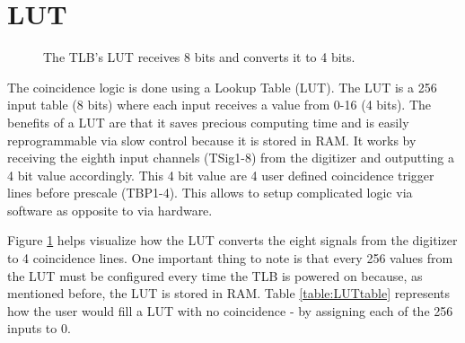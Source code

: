 \section{LUT}
\label{LUT}


\begin{figure}
    \centering
    \caption[LUT 8 to 4 bit conversion]{The TLB's LUT receives 8 bits and converts it to 4 bits.}
    \label{fig:LUT}
\end{figure}

The coincidence logic is done using a Lookup Table (LUT). The LUT is a 256 input table (8 bits) where each input receives a value from 0-16 (4 bits). The benefits of a LUT are that it saves precious computing time and is easily reprogrammable via slow control because it is stored in RAM. It works by receiving the eighth input channels (TSig1-8) from the digitizer and outputting a 4 bit value accordingly. This 4 bit value are 4 user defined coincidence trigger lines before prescale (TBP1-4). This allows to setup complicated logic via software as opposite to via hardware.

Figure \ref{fig:LUT} helps visualize how the LUT converts the eight signals from the digitizer to 4 coincidence lines. One important thing to note is that every 256 values from the LUT must be configured every time the TLB is powered on because, as mentioned before, the LUT is stored in RAM. Table \ref{table:LUTtable} represents how the user would fill a LUT with no coincidence - by assigning each of the 256 inputs to 0.

